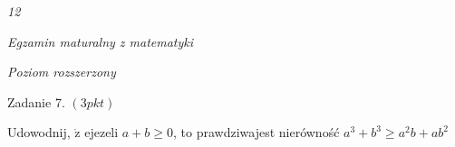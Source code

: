 \documentclass[a4paper,12pt]{article}
\begin{document}
{\it 12}

{\it Egzamin maturalny z matematyki}

{\it Poziom rozszerzony}

Zadanie 7. $(3pkt)$

Udowodnij, $\dot{\mathrm{z}}$ ejezeli $a+b\geq 0$, to prawdziwajest nierówność $a^{3}+b^{3}\geq a^{2}b+ab^{2}$
\end{document}
